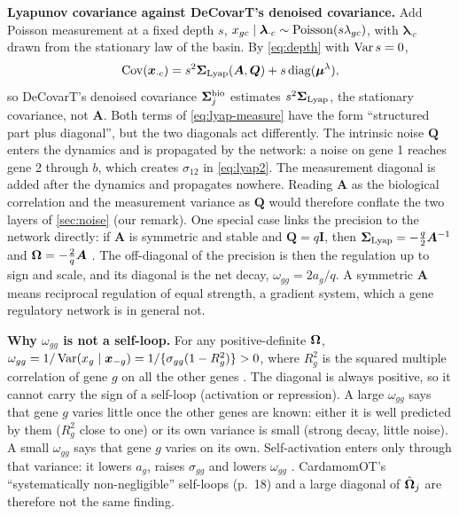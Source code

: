 \documentclass[11pt,a4paper]{article}
\begin{document}
\textbf{Lyapunov covariance against DeCovarT's denoised covariance.} Add Poisson measurement at a fixed
depth $s$, $x_{gc}\mid\bm\lambda_{\cdot c}\sim\operatorname{Poisson}(s\lambda_{gc})$, with $\bm\lambda_{\cdot c}$ drawn from the
stationary law of the basin. By \cref{eq:depth} with $\operatorname{Var} s=0$,
\begin{equation}\label{eq:lyap-measure}
\operatorname{Cov}(\bm x_{\cdot c})=s^2\bm{\Sigma}_{\mathrm{Lyap}}(\bm A,\bm Q)+s\operatorname{diag}(\bm{\mu}^{\lambda}),
\end{equation}
so DeCovarT's denoised covariance $\bm{\Sigma}^{\mathrm{bio}}_j$ estimates $s^2\bm{\Sigma}_{\mathrm{Lyap}}$, the
stationary covariance, not $\bm A$. Both terms of \cref{eq:lyap-measure} have the form \enquote{structured part
plus diagonal}, but the two diagonals act differently. The intrinsic noise $\bm Q$ enters the dynamics and is
propagated by the network: a noise on gene 1 reaches gene 2 through $b$, which creates $\sigma_{12}$ in
\cref{eq:lyap2}. The measurement diagonal is added after the dynamics and propagates nowhere. Reading $\bm A$
as the biological correlation and the measurement variance as $\bm Q$ would therefore conflate the two
layers of \cref{sec:noise} (our remark). One special case links the precision to the network directly: if
$\bm A$ is symmetric and stable and $\bm Q=q\bm I$, then $\bm{\Sigma}_{\mathrm{Lyap}}=-\tfrac q2\bm A^{-1}$ and
$\bm{\Omega}=-\tfrac2q\bm A$ . The off-diagonal of the precision is then the regulation up to sign
and scale, and its diagonal is the net decay, $\omega_{gg}=2a_g/q$. A symmetric $\bm A$ means reciprocal
regulation of equal strength, a gradient system, which a gene regulatory network is in general not.

\textbf{Why $\omega_{gg}$ is not a self-loop.} For any positive-definite $\bm{\Omega}$,
$\omega_{gg}=1/\operatorname{Var}(x_g\mid\bm x_{-g})=1/\{\sigma_{gg}(1-R^2_g)\}>0$, where $R^2_g$ is the squared multiple
correlation of gene $g$ on all the other genes . The diagonal is always positive, so it cannot carry
the sign of a self-loop (activation or repression). A large $\omega_{gg}$ says that gene $g$ varies little
once the other genes are known: either it is well predicted by them ($R^2_g$ close to one) or its own
variance is small (strong decay, little noise). A small $\omega_{gg}$ says that gene $g$ varies on its own.
Self-activation enters only through that variance: it lowers $a_g$, raises $\sigma_{gg}$ and lowers
$\omega_{gg}$ . CardamomOT's \enquote{systematically non-negligible} self-loops (p.~18) and a
large diagonal of $\hat{\bm{\Omega}}_j$ are therefore not the same finding.
\end{document}
